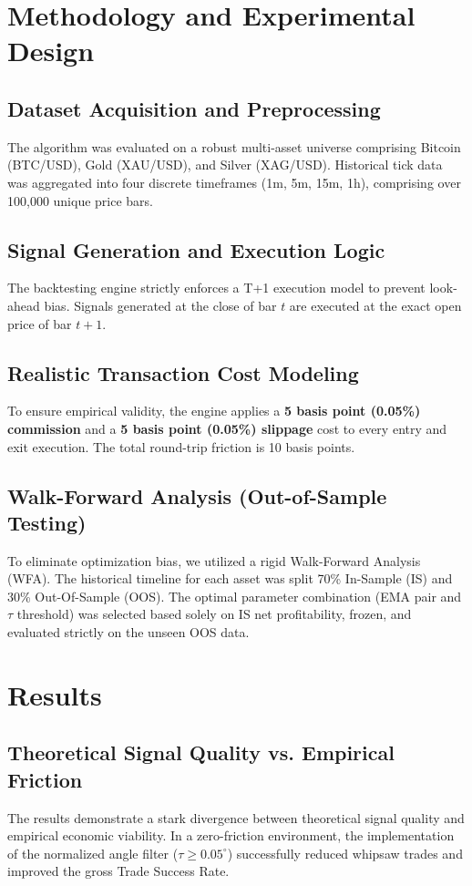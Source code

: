 \documentclass[conference]{IEEEtran}
\begin{document}
\section{Methodology and Experimental Design}
\subsection{Dataset Acquisition and Preprocessing}
The algorithm was evaluated on a robust multi-asset universe comprising Bitcoin (BTC/USD), Gold (XAU/USD), and Silver (XAG/USD). Historical tick data was aggregated into four discrete timeframes (1m, 5m, 15m, 1h), comprising over 100,000 unique price bars.

\subsection{Signal Generation and Execution Logic}
The backtesting engine strictly enforces a T+1 execution model to prevent look-ahead bias. Signals generated at the close of bar $t$ are executed at the exact open price of bar $t+1$. 

\subsection{Realistic Transaction Cost Modeling}
To ensure empirical validity, the engine applies a \textbf{5 basis point (0.05\%) commission} and a \textbf{5 basis point (0.05\%) slippage} cost to every entry and exit execution. The total round-trip friction is 10 basis points.

\subsection{Walk-Forward Analysis (Out-of-Sample Testing)}
To eliminate optimization bias, we utilized a rigid Walk-Forward Analysis (WFA). The historical timeline for each asset was split 70\% In-Sample (IS) and 30\% Out-Of-Sample (OOS). The optimal parameter combination (EMA pair and $\tau$ threshold) was selected based solely on IS net profitability, frozen, and evaluated strictly on the unseen OOS data.

\section{Results}
\subsection{Theoretical Signal Quality vs. Empirical Friction}
The results demonstrate a stark divergence between theoretical signal quality and empirical economic viability. In a zero-friction environment, the implementation of the normalized angle filter ($\tau \ge 0.05^\circ$) successfully reduced whipsaw trades and improved the gross Trade Success Rate. 
\end{document}
